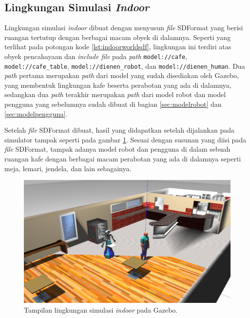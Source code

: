 \subsection{Lingkungan Simulasi \emph{Indoor}}
\label{subsec:lingkunganindoor}

Lingkungan simulasi \emph{indoor} dibuat dengan menyusun \emph{file} SDFormat yang berisi ruangan tertutup dengan berbagai macam obyek di dalamnya.
Seperti yang terlihat pada potongan kode \ref{lst:indoorworldsdf},
  lingkungan ini terdiri atas obyek pencahayaan dan \emph{include file} pada \emph{path} \lstinline{model://cafe}, \lstinline{model://cafe_table}, \lstinline{model://dienen_robot}, dan \lstinline{model://dienen_human}.
Dua \emph{path} pertama merupakan \emph{path} dari model yang sudah disediakan oleh Gazebo,
  yang membentuk lingkungan kafe beserta perabotan yang ada di dalamnya,
  sedangkan dua \emph{path} terakhir merupakan \emph{path} dari model robot dan model pengguna yang sebelumnya sudah dibuat di bagian \ref{sec:modelrobot} dan \ref{sec:modelpengguna}.



Setelah \emph{file} SDFormat dibuat,
  hasil yang didapatkan setelah dijalankan pada simulator tampak seperti pada gambar \ref{fig:lingkunganindoor}.
Sesuai dengan susunan yang diisi pada \emph{file} SDFormat,
  tampak adanya model robot dan pengguna di dalam sebuah ruangan kafe dengan berbagai macam perabotan yang ada di dalamnya seperti meja, lemari, jendela, dan lain sebagainya.

\begin{figure}[ht]
  \centering
  \includegraphics[scale=0.23]{gambar/lingkungan-indoor.png}
  \caption{Tampilan lingkungan simulasi \emph{indoor} pada Gazebo.}
  \label{fig:lingkunganindoor}
\end{figure}
